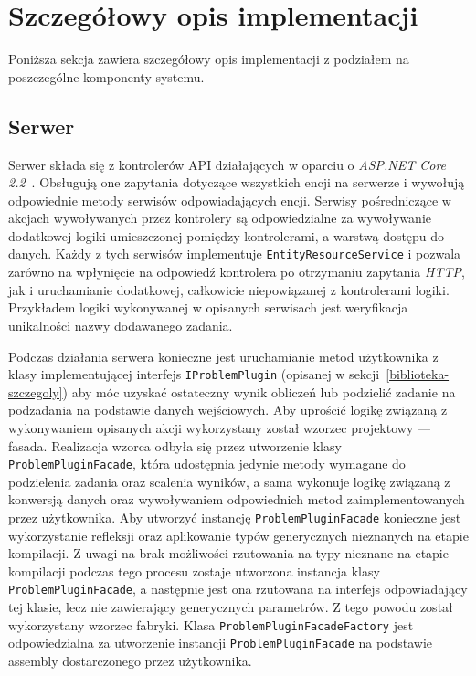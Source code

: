 \documentclass[a4paper,11pt,twoside]{report}
\theoremstyle{definition}
\begin{document}
\section{Szczegółowy opis implementacji}
\label{szczegolowy-opis-implementacji}

Poniższa sekcja zawiera szczegółowy opis implementacji z podziałem na poszczególne komponenty systemu.


\subsection{Serwer}

Serwer składa się z kontrolerów API działających w oparciu o \textit{ASP.NET Core 2.2}~\cite{aspnet-core}.
Obsługują one zapytania dotyczące wszystkich encji na serwerze i wywołują odpowiednie metody serwisów odpowiadających encji.
Serwisy pośredniczące w akcjach wywoływanych przez kontrolery są odpowiedzialne za wywoływanie dodatkowej logiki umieszczonej pomiędzy kontrolerami, a warstwą dostępu do danych.
Każdy z tych serwisów implementuje \texttt{EntityResourceService} i pozwala zarówno na wpłynięcie na odpowiedź kontrolera po otrzymaniu zapytania \textit{HTTP}, jak i uruchamianie dodatkowej, całkowicie niepowiązanej z kontrolerami logiki.
Przykładem logiki wykonywanej w opisanych serwisach jest weryfikacja unikalności nazwy dodawanego zadania.

Podczas działania serwera konieczne jest uruchamianie metod użytkownika z klasy implementującej interfejs \texttt{IProblemPlugin} (opisanej w sekcji~\ref{biblioteka-szczegoly}) aby móc uzyskać ostateczny wynik obliczeń lub podzielić zadanie na podzadania na podstawie danych wejściowych.
Aby uprościć logikę związaną z wykonywaniem opisanych akcji wykorzystany został wzorzec projektowy --- fasada.
Realizacja wzorca odbyła się przez utworzenie klasy \texttt{ProblemPluginFacade}, która udostępnia jedynie metody wymagane do podzielenia zadania oraz scalenia wyników, a sama wykonuje logikę związaną z konwersją danych oraz wywoływaniem odpowiednich metod zaimplementowanych przez użytkownika.
Aby utworzyć instancję \texttt{ProblemPluginFacade} konieczne jest wykorzystanie refleksji oraz aplikowanie typów generycznych nieznanych na etapie kompilacji.
Z uwagi na brak możliwości rzutowania na typy nieznane na etapie kompilacji podczas tego procesu zostaje utworzona instancja klasy \texttt{ProblemPluginFacade}, a następnie jest ona rzutowana na interfejs odpowiadający tej klasie, lecz nie zawierający generycznych parametrów.
Z tego powodu został wykorzystany wzorzec fabryki.
Klasa \texttt{ProblemPluginFacadeFactory} jest odpowiedzialna za utworzenie instancji \texttt{ProblemPluginFacade} na podstawie assembly dostarczonego przez użytkownika.
\end{document}
